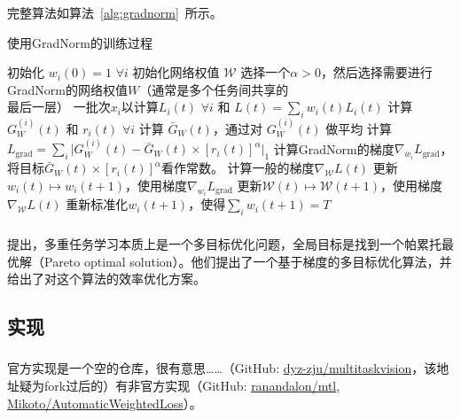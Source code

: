 \documentclass{ctexart}
\begin{document}
完整算法如算法~\ref{alg:gradnorm}~所示。

\begin{algorithm}[htb]
    \caption{使用GradNorm的训练过程}
    \label{alg:gradnorm}
 \begin{algorithmic}
    \STATE 初始化 $w_i(0)=1$ $\forall i$
    \STATE 初始化网络权值 $\mathcal{W}$
    \STATE 选择一个$\alpha> 0$，然后选择需要进行GradNorm的网络权值$W$（通常是多个任务间共享的\\ \hspace{1em} 最后一层）
    一批次$x_i$以计算$L_i(t)$ $\forall i$ 和 $L(t) = \sum_i w_i(t)L_i(t)$ {\fangsong [一般前向流程]}
    \STATE 计算 $G_W^{(i)}(t)$ 和 $r_i(t)$ $\forall i$
    \STATE 计算 $\bar{G}_W(t)$，通过对 $G_W^{(i)}(t)$ 做平均
    \STATE 计算 $L_{\text{grad}}= \sum_i\rvert G_W^{(i)}(t) - \bar{G}_W(t)\times [r_i(t)]^{\alpha}\rvert_1$
    \STATE 计算GradNorm的梯度$\nabla_{w_i} L_{\text{grad}}$，将目标$\bar{G}_W(t)\times [r_i(t)]^{\alpha}$看作常数。
    \STATE 计算一般的梯度$\nabla_{\mathcal{W}} L(t)$
    \STATE 更新$w_i(t) \mapsto w_i(t+1)$，使用梯度$\nabla_{w_i} L_{\text{grad}}$
    \STATE 更新$\mathcal{W}(t) \mapsto \mathcal{W}(t+1)$，使用梯度$\nabla_{\mathcal{W}} L(t)$ {\fangsong [一般反向流程]}
    \STATE 重新标准化$w_i(t+1)$，使得$\sum_iw_i(t+1) = T$
    \ENDFOR
 \end{algorithmic}
 \end{algorithm}

\subsubsection{}

\citet{Sener18Pareto}提出，多重任务学习本质上是一个多目标优化问题，全局目标是找到一个帕累托最优解（Pareto optimal solution）。他们提出了一个基于梯度的多目标优化算法，并给出了对这个算法的效率优化方案。

\subsection{实现}

\subsubsection{}

官方实现是一个空的仓库，很有意思……（GitHub: \href{https://github.com/dyz-zju/multitaskvision}{dyz-zju/multitaskvision}，该地址疑为fork过后的）有非官方实现（GitHub: \href{https://github.com/ranandalon/mtl}{ranandalon/mtl}, \href{https://github.com/Mikoto10032/AutomaticWeightedLoss}{Mikoto/Automatic\-Weighted\-Loss}）。
\end{document}
